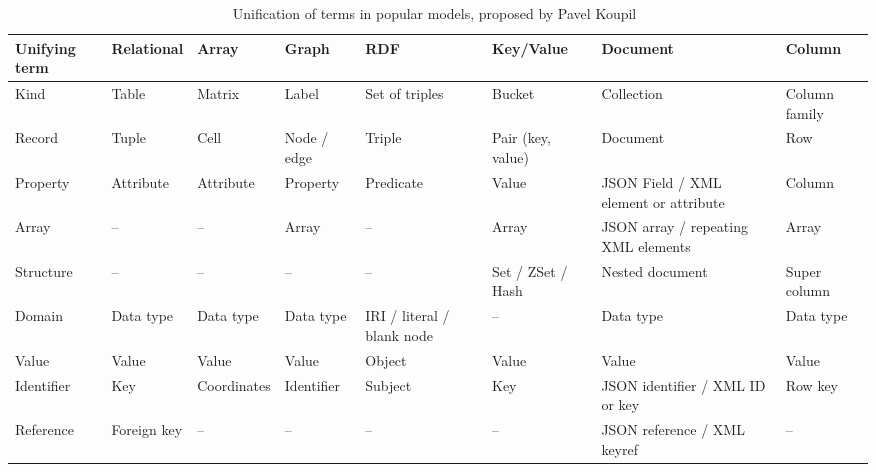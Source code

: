 \begin{table}[ht]%
\centering
\scriptsize
\caption{Unification of terms in popular models, proposed by Pavel Koupil~\cite{koupil_thesis}}
\label{table:datamodels:terms}
\def\arraystretch{1.5}
\begin{tabular}{
    >{\raggedright\arraybackslash}p{13.0mm} %
    >{\raggedright\arraybackslash}p{15.2mm} %
    >{\raggedright\arraybackslash}p{15.7mm} %
    >{\raggedright\arraybackslash}p{11.7mm} %
    >{\raggedright\arraybackslash}p{12.2mm} %
    >{\raggedright\arraybackslash}p{16.2mm} %
    >{\raggedright\arraybackslash}p{15.5mm} %
    >{\raggedright\arraybackslash}p{11.7mm} %
    }
        \toprule
        \textbf{Unifying term} & \textbf{Relational}  & \textbf{Array}        & \textbf{Graph}      & \textbf{RDF}            & \textbf{Key/Value}      & \textbf{Document}        & \textbf{Column}      \\
        \midrule
        Kind          & Table       & Matrix       & Label      & Set of triples & Bucket         & Collection      & Column family \\
        
        Record        & Tuple         & Cell         & Node / edge  & Triple         & Pair (key, value) & Document        & Row           \\
        
        Property      & Attribute   & Attribute    & Property   & Predicate      & Value          & JSON Field / XML element or attribute           & Column        \\
        Array         & --         & --          & Array      & --            & Array            & JSON array / repeating XML elements           & Array         \\
        Structure     & --         & --          & --        & --            & Set / ZSet / Hash            & Nested document & Super column \\
        Domain        & Data type   & Data type    & Data type  & IRI / literal / blank node & --            & Data type       & Data type     \\
        Value         & Value       & Value        & Value      & Object         & Value          & Value           & Value         \\
        Identifier    & Key & Coordinates & Identifier & Subject        & Key            & JSON identifier / XML ID or key      & Row key    \\
        Reference     & Foreign key & --          & --        & --            & --            & JSON reference / XML keyref       & --           \\
        \bottomrule
    \end{tabular}
\end{table}

